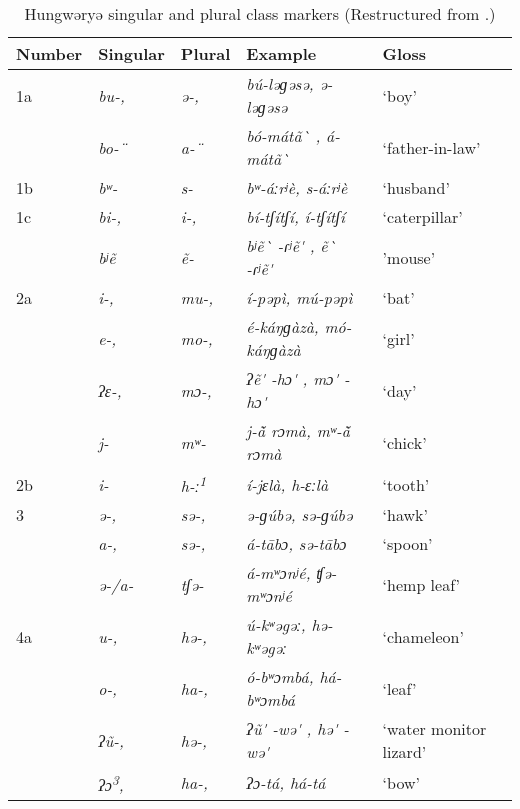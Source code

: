 \documentclass[output=paper]{langsci/langscibook}
\begin{document}
  
\begin{table}[p]
\caption{Hungwəryə singular and plural class markers (Restructured from \citet{HackettDavey2009}.)}
 \label{tab:kainji:19}
\begin{tabularx}{\textwidth}{lllll}
\lsptoprule
 {Number}	& {Singular}	& {Plural}	& {Example}	& {Gloss}\\
\midrule
1a	& \textit{bu-,}	& \textit{ə-,}	& \textit{bú-ləɡəsə, ə-ləɡəsə} &‘boy’\\
        &   \textit{bo-¨} & \textit{a-¨}      & \textit{bó-mátã\`{} , á-mátã\`{}} &\mbox{‘father-in-law’}\\
1b	& \textit{bʷ-} & \textit{s-}	& \textit{bʷ-áːrʲè, s-áːrʲè}	& `husband'\\
1c	& \textit{bi-,} 	& \textit{i-,} & \textit{bí-tʃítʃí, í-tʃítʃí} & `caterpillar' \\
        & \textit{bʲẽ}   &  \textit{ẽ-}    & \textit{bʲẽ\`{} -ɾʲẽ\'{} , ẽ\`{} -ɾʲẽ\'{}}&	'mouse'\\
2a	& \textit{i-,}  	& \textit{mu-,}  & \textit{í-pəpì, mú-pəpì} & `bat'\\
        & \textit{e-,}   & \textit{mo-,}  & \textit{é-káŋɡàzà, mó-káŋɡàzà} & `girl'\\
        & \textit{ʔɛ-,}  & \textit{mɔ-,}  & \textit{ʔẽ\'{} -hɔ\'{} , mɔ\'{} -hɔ\'{} } & `day'\\
        & \textit{j-}    & \textit{mʷ-}   & \textit{j-ã\v{} rɔmà, mʷ-ã\v{} rɔmà}	& `chick'\\
2b	& \textit{i-}	& \textit{h-ː\textsuperscript{1}}	& \textit{í-jɛlà, h-ɛːlà}	& `tooth'\\
3	& \textit{ə-,} 	& \textit{sə-,} 	& \textit{ə-ɡúbə, sə-ɡúbə} & `hawk'\\
        &  \textit{a-,}   &    \textit{sə-,}   & \textit{á-tābɔ, sə-tābɔ} & `spoon' \\
        &   \textit{ə-/a-}&  \textit{tʃə-}    & \textit{á-mʷɔnʲé, ʧə-mʷɔnʲé}	& `hemp leaf'\\
4a	& \textit{u-,}  	& \textit{hə-,}   & \textit{ú-kʷəgəː, hə-kʷəgəː}& `chameleon' \\
        &  \textit{o-,}               	&  \textit{ha-,}    & \textit{ó-bʷɔmbá, há-bʷɔmbá}& `leaf'\\
        &  \textit{ʔũ-,}              	& \textit{hə-,}     & \textit{ʔũ\'{} -wə\'{} , hə\'{} -wə\'{} }& `water monitor lizard'\\
        &  \textit{ʔɔ\textsuperscript{3},} & \textit{ha-,}     & \textit{ʔɔ-tá, há-tá}& `bow'\\

\end{tabularx}
\end{table}
\end{document}
